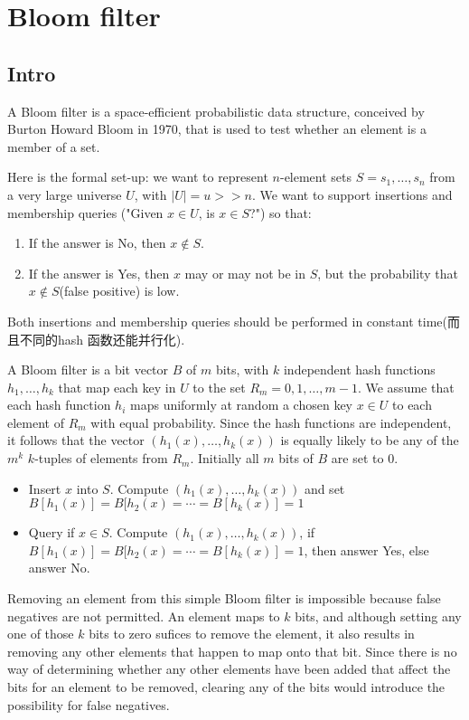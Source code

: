 \section{Bloom filter}
\subsection{Intro}
A Bloom filter is a space-efficient probabilistic data structure, conceived by Burton Howard Bloom in 1970, that is used to test whether an element is a member of a set.

Here is the formal set-up: we want to represent $n$-element sets $S = {s_1, \ldots, s_n}$ from a very large universe $U$, with $|U| = u >> n$. 
We want to support insertions and membership queries ("Given $x \in U$, is $x \in S$?") so that:
\begin{enumerate}
\item If the answer is No, then $x \notin S$.
\item If the answer is Yes, then $x$ may or may not be in $S$, but the probability that $x \notin S$(false positive) is low.
\end{enumerate}
Both insertions and membership queries should be performed in constant time(而且不同的hash 函数还能并行化).

A Bloom filter is a bit vector $B$ of $m$ bits, with $k$ independent hash functions $h_1, \ldots, h_k$ that map each key in $U$ to the set $R_m = {0, 1, \ldots, m − 1}$.
We assume that each hash function $h_i$ maps uniformly at random a chosen key $x \in U$ to each element of $R_m$ with equal probability.
Since the hash functions are independent, it follows that the vector $(h_1(x), \ldots, h_k(x))$ is equally likely to be any of the $m^k$ $k$-tuples of elements from $R_m$.
Initially all $m$ bits of $B$ are set to $0$.

\begin{itemize}
\item Insert $x$ into $S$. Compute $(h_1(x), \ldots, h_k(x))$ and set $B[h_1(x)] = B[h_2(x) = \cdots = B[h_k(x)] = 1$
\item Query if $x \in S$. Compute $(h_1(x), \ldots, h_k(x))$, if $B[h_1(x)] = B[h_2(x) = \cdots = B[h_k(x)] = 1$, then answer Yes, else answer No.
\end{itemize}

Removing an element from this simple Bloom filter is impossible because false negatives are not permitted.
An element maps to $k$ bits, and although setting any one of those $k$ bits to zero sufices to remove the element, it also results in removing any other elements that happen to map onto that bit.
Since there is no way of determining whether any other elements have been added that affect the bits for an element to be removed, clearing any of the bits would introduce the possibility for false negatives.

